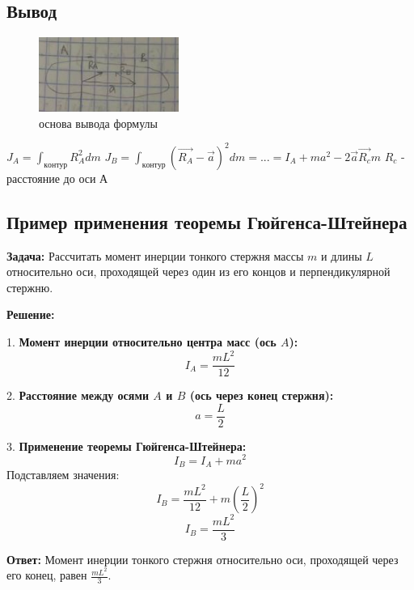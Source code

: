 \documentclass[a4paper]{article}
\begin{document}
	\subsection*{Вывод}
	\begin{flushleft}
			\begin{figure}[h]
			
			\centering
			
			\includegraphics[width=0.8\linewidth]{images/22_2.png}
			
			\caption{основа вывода формулы}
			
			\label{fig:mpr}
			
		\end{figure}
		$J_A = \int_{контур} R_A ^ 2 dm$ \linebreak
		$J_B = \int_{контур} (\vec{R_A} - \vec{a}) ^ 2 dm = ... = I_A + ma^2 - 2 \vec{a}\vec{R_c}m$ \linebreak
		$R_c$ - расстояние до оси А
	\end{flushleft}
	\subsection*{Пример применения теоремы Гюйгенса-Штейнера}
	
	\textbf{Задача:} Рассчитать момент инерции тонкого стержня массы \( m \) и длины \( L \) относительно оси, проходящей через один из его концов и перпендикулярной стержню.
	
	\textbf{Решение:}
	
	1. \textbf{Момент инерции относительно центра масс (ось \( A \)):}
	\[
	I_A = \frac{m L^2}{12}
	\]
	
	2. \textbf{Расстояние между осями \( A \) и \( B \) (ось через конец стержня):}
	\[
	a = \frac{L}{2}
	\]
	
	3. \textbf{Применение теоремы Гюйгенса-Штейнера:}
	\[
	I_B = I_A + m a^2
	\]
	Подставляем значения:
	\[
	I_B = \frac{m L^2}{12} + m \left( \frac{L}{2} \right)^2
	\]
	\[
	I_B = \frac{m L^2}{3}
	\]
	
	\textbf{Ответ:} Момент инерции тонкого стержня относительно оси, проходящей через его конец, равен \( \frac{m L^2}{3} \).
	
\end{document}
